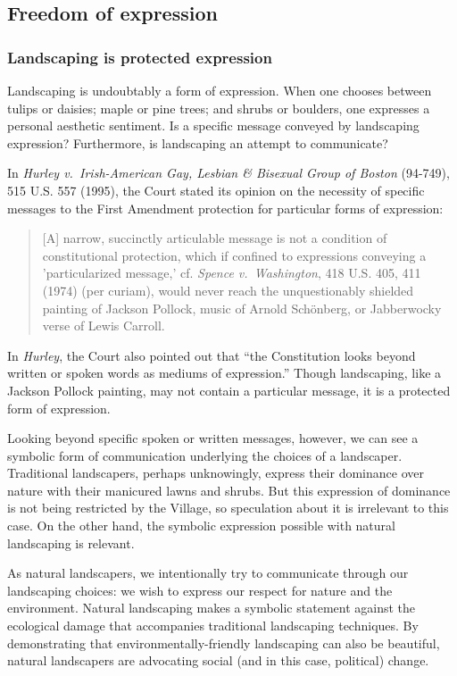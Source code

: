 \documentclass[12pt]{article}
\begin{document}
\subsection{Freedom of expression}

\subsubsection{Landscaping is protected expression}
Landscaping is undoubtably a form of expression.
When one chooses between tulips or daisies; maple or pine trees; and shrubs or boulders, one expresses a personal aesthetic sentiment.
Is a specific message conveyed by landscaping expression?
Furthermore, is landscaping an attempt to communicate?

In {\em Hurley v.\ Irish-American Gay, Lesbian \& Bisexual Group of Boston} (94-749), 515 U.S. 557 (1995), the Court stated its opinion on the necessity of specific messages to the First Amendment protection for particular forms of expression:
\begin{quote}
[A] narrow, succinctly articulable message is not a condition of constitutional protection, which if confined to expressions conveying a 'particularized message,' cf. {\em Spence v.\ Washington}, 418 U.S. 405, 411 (1974) (per curiam), would never reach the unquestionably shielded painting of Jackson Pollock, music of Arnold Sch\"onberg, or Jabberwocky verse of Lewis Carroll.
\end{quote}
In {\em Hurley}, the Court also pointed out that ``the Constitution looks beyond written or spoken words as mediums of expression.'' 
Though landscaping, like a Jackson Pollock painting, may not contain a particular message, it is a protected form of expression.

Looking beyond specific spoken or written messages, however, we can see a symbolic form of communication underlying the choices of a landscaper.
Traditional landscapers, perhaps unknowingly, express their dominance over nature with their manicured lawns and shrubs.
But this expression of dominance is not being restricted by the Village, so speculation about it is irrelevant to this case.
On the other hand, the symbolic expression possible with natural landscaping is relevant.

As natural landscapers, we intentionally try to communicate through our landscaping choices:  we wish to express our respect for nature and the environment.
Natural landscaping makes a symbolic statement against the ecological damage that accompanies traditional landscaping techniques.
By demonstrating that environmentally-friendly landscaping can also be beautiful, natural landscapers are advocating social (and in this case, political) change.
  
\end{document}

